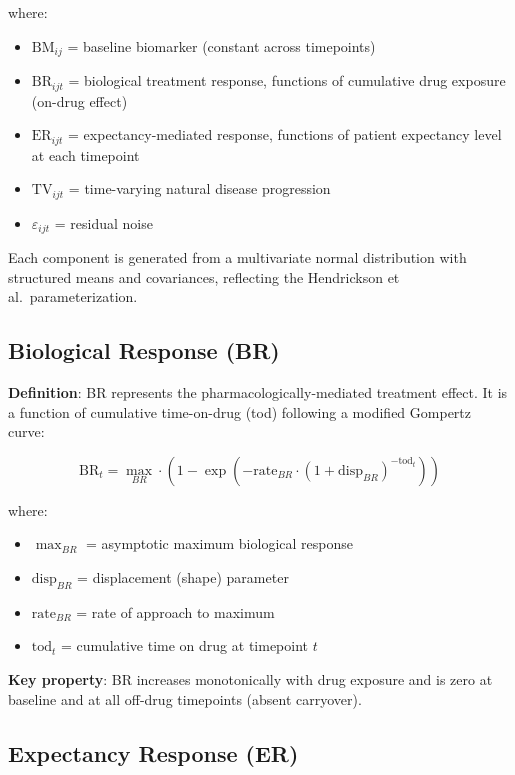 \documentclass[12pt,a4paper]{article}
\begin{document}
where:
\begin{itemize}
\item $\text{BM}_{ij}$ = baseline biomarker (constant across timepoints)
\item $\text{BR}_{ijt}$ = biological treatment response, functions of cumulative drug exposure (on-drug effect)
\item $\text{ER}_{ijt}$ = expectancy-mediated response, functions of patient expectancy level at each timepoint
\item $\text{TV}_{ijt}$ = time-varying natural disease progression
\item $\varepsilon_{ijt}$ = residual noise
\end{itemize}

Each component is generated from a multivariate normal distribution with structured means and covariances, reflecting the Hendrickson et al.~parameterization.

\subsection{Biological Response (BR)}

\textbf{Definition}: BR represents the pharmacologically-mediated treatment effect. It is a function of cumulative time-on-drug (tod) following a modified Gompertz curve:

\begin{equation}
\text{BR}_t = \max_{BR} \cdot \left(1 - \exp\left(-\text{rate}_{BR} \cdot \left(1 + \text{disp}_{BR}\right)^{-\text{tod}_t}\right)\right)
\end{equation}

where:
\begin{itemize}
\item $\max_{BR}$ = asymptotic maximum biological response
\item $\text{disp}_{BR}$ = displacement (shape) parameter
\item $\text{rate}_{BR}$ = rate of approach to maximum
\item $\text{tod}_t$ = cumulative time on drug at timepoint $t$
\end{itemize}

\textbf{Key property}: BR increases monotonically with drug exposure and is zero at baseline and at all off-drug timepoints (absent carryover).

\subsection{Expectancy Response (ER)}
\end{document}
